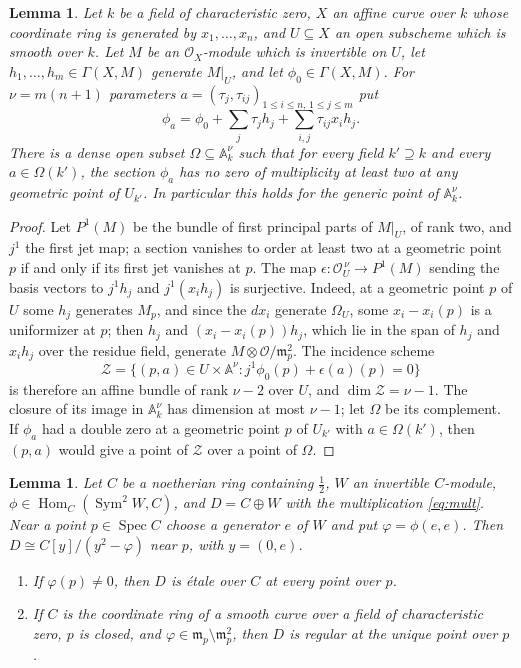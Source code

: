 \documentclass{amsart}
\newtheorem{lemma}[theorem]{Lemma}
\theoremstyle{definition}
\theoremstyle{remark}
\numberwithin{equation}{section}
\newcommand{\A}{\mathbb{A}}
\newcommand{\m}{\mathfrak{m}}
\DeclareMathOperator{\Hom}{Hom}
\DeclareMathOperator{\Spec}{Spec}
\DeclareMathOperator{\Sym}{Sym}
\begin{document}
\begin{lemma}\label{lem:jets}
Let $k$ be a field of characteristic zero, $X$ an affine curve over $k$ whose coordinate ring is generated by $x_1,\dots,x_n$, and $U\subseteq X$ an open subscheme which is smooth over $k$. Let $M$ be an $\mathcal O_X$-module which is invertible on $U$, let $h_1,\dots,h_m\in\Gamma(X,M)$ generate $M|_U$, and let $\phi_0\in\Gamma(X,M)$. For $\nu=m(n+1)$ parameters $a=(\tau_j,\tau_{ij})_{1\le i\le n,\,1\le j\le m}$ put
\begin{equation}\label{eq:phia}
\phi_a=\phi_0+\sum_{j}\tau_jh_j+\sum_{i,j}\tau_{ij}x_ih_j .
\end{equation}
There is a dense open subset $\Omega\subseteq\A^\nu_k$ such that for every field $k'\supseteq k$ and every $a\in\Omega(k')$, the section $\phi_a$ has no zero of multiplicity at least two at any geometric point of $U_{k'}$. In particular this holds for the generic point of $\A^\nu_k$.
\end{lemma}

\begin{proof}
Let $P^1(M)$ be the bundle of first principal parts of $M|_U$, of rank two, and $j^1$ the first jet map; a section vanishes to order at least two at a geometric point $p$ if and only if its first jet vanishes at $p$. The map $\epsilon\colon\mathcal O_U^{\,\nu}\to P^1(M)$ sending the basis vectors to $j^1h_j$ and $j^1(x_ih_j)$ is surjective. Indeed, at a geometric point $p$ of $U$ some $h_j$ generates $M_p$, and since the $dx_i$ generate $\Omega_U$, some $x_i-x_i(p)$ is a uniformizer at $p$; then $h_j$ and $(x_i-x_i(p))h_j$, which lie in the span of $h_j$ and $x_ih_j$ over the residue field, generate $M\otimes\mathcal O/\m_p^2$. The incidence scheme
\[
\mathcal Z=\{(p,a)\in U\times\A^\nu: j^1\phi_0(p)+\epsilon(a)(p)=0\}
\]
is therefore an affine bundle of rank $\nu-2$ over $U$, and $\dim\mathcal Z=\nu-1$. The closure of its image in $\A^\nu_k$ has dimension at most $\nu-1$; let $\Omega$ be its complement. If $\phi_a$ had a double zero at a geometric point $p$ of $U_{k'}$ with $a\in\Omega(k')$, then $(p,a)$ would give a point of $\mathcal Z$ over a point of $\Omega$.
\end{proof}

\begin{lemma}\label{lem:localdouble}
Let $C$ be a noetherian ring containing $\tfrac12$, $W$ an invertible $C$-module, $\phi\in\Hom_C(\Sym^2W,C)$, and $D=C\oplus W$ with the multiplication \eqref{eq:mult}. Near a point $p\in\Spec C$ choose a generator $e$ of $W$ and put $\varphi=\phi(e,e)$. Then $D\cong C[y]/(y^2-\varphi)$ near $p$, with $y=(0,e)$.
\begin{enumerate}
\item If $\varphi(p)\ne0$, then $D$ is \'etale over $C$ at every point over $p$.
\item If $C$ is the coordinate ring of a smooth curve over a field of characteristic zero, $p$ is closed, and $\varphi\in\m_p\setminus\m_p^2$, then $D$ is regular at the unique point over $p$.
\end{enumerate}
\end{lemma}
\end{document}
